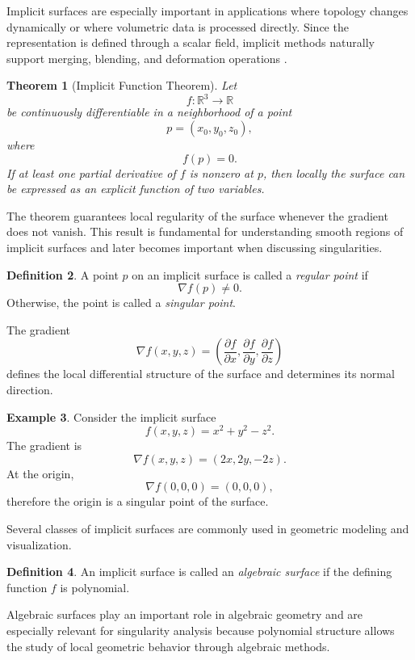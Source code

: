 \documentclass[12pt, a4paper, oneside]{book}
\theoremstyle{plain}
\newtheorem{theorem}{Theorem}[chapter]
\theoremstyle{definition}
\newtheorem{definition}[theorem]{Definition}
\newtheorem{example}[theorem]{Example}
\theoremstyle{remark}
\theoremstyle{definition}
\begin{document}
Implicit surfaces are especially important in applications where topology changes dynamically or where volumetric data is processed directly. Since the representation is defined through a scalar field, implicit methods naturally support merging, blending, and deformation operations \cite{bloomenthal2000implicit}.

\begin{theorem}[Implicit Function Theorem]
Let
\[
f : \mathbb{R}^3 \to \mathbb{R}
\]
be continuously differentiable in a neighborhood of a point
\[
p=(x_0,y_0,z_0),
\]
where
\[
f(p)=0.
\]
If at least one partial derivative of $f$ is nonzero at $p$, then locally the surface can be expressed as an explicit function of two variables.
\end{theorem}

The theorem guarantees local regularity of the surface whenever the gradient does not vanish. This result is fundamental for understanding smooth regions of implicit surfaces and later becomes important when discussing singularities.

\begin{definition}
A point $p$ on an implicit surface is called a \emph{regular point} if
\[
\nabla f(p)\neq 0.
\]
Otherwise, the point is called a \emph{singular point}.
\end{definition}

The gradient
\[
\nabla f(x,y,z)=
\left(
\frac{\partial f}{\partial x},
\frac{\partial f}{\partial y},
\frac{\partial f}{\partial z}
\right)
\]
defines the local differential structure of the surface and determines its normal direction.

\begin{example}
Consider the implicit surface
\[
f(x,y,z)=x^2+y^2-z^2.
\]
The gradient is
\[
\nabla f(x,y,z)=(2x,2y,-2z).
\]
At the origin,
\[
\nabla f(0,0,0)=(0,0,0),
\]
therefore the origin is a singular point of the surface.
\end{example}

Several classes of implicit surfaces are commonly used in geometric modeling and visualization.

\begin{definition}
An implicit surface is called an \emph{algebraic surface} if the defining function $f$ is polynomial.
\end{definition}

Algebraic surfaces play an important role in algebraic geometry and are especially relevant for singularity analysis because polynomial structure allows the study of local geometric behavior through algebraic methods.
\end{document}
